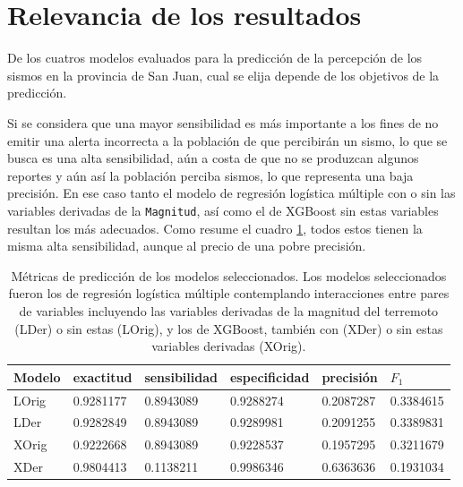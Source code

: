 \documentclass[a4paper]{report}
\begin{document}
\section{Relevancia de los resultados}

De los cuatros modelos evaluados para la predicción de la percepción de los sismos en la provincia de San Juan, cual se elija depende de los objetivos de la predicción.

Si se considera que una mayor sensibilidad es más importante a los fines de no emitir una alerta incorrecta a la población de que percibirán un sismo, lo que se busca es una alta sensibilidad, aún a costa de que no se produzcan algunos reportes y aún así la población perciba sismos, lo que representa una baja precisión.
En ese caso tanto el modelo de regresión logística múltiple con o sin las variables derivadas de la \verb'Magnitud', así como el de XGBoost sin estas variables resultan los más adecuados.
Como resume el cuadro \ref{tab:metricas_modelos}, todos estos tienen la misma alta sensibilidad, aunque al precio de una pobre precisión.

\begin{table}[!ht]
	\centering
	\begin{tabular}{llllll}
	\toprule
	Modelo & exactitud & sensibilidad & especificidad & precisión & \(F_1\) \\
	\midrule
	LOrig & \num{0.9281177} & \num{0.8943089} & \num{0.9288274} & \num{0.2087287} & \num{0.3384615}\\
	LDer & \num{0.9282849} & \num{0.8943089} & \num{0.9289981} & \num{0.2091255} & \num{0.3389831}\\
	XOrig & \num{0.9222668} & \num{0.8943089} & \num{0.9228537} & \num{0.1957295} & \num{0.3211679} \\
	XDer & \num{0.9804413} & \num{0.1138211} & \num{0.9986346} & \num{0.6363636} & \num{0.1931034} \\
	\bottomrule
	\end{tabular}
	\caption{Métricas de predicción de los modelos seleccionados. Los modelos seleccionados fueron los de regresión logística múltiple contemplando interacciones entre pares de variables incluyendo las variables derivadas de la magnitud del terremoto (LDer) o sin estas (LOrig), y los de XGBoost, también con (XDer) o sin estas variables derivadas (XOrig).}
	\label{tab:metricas_modelos}
\end{table}
\end{document}
